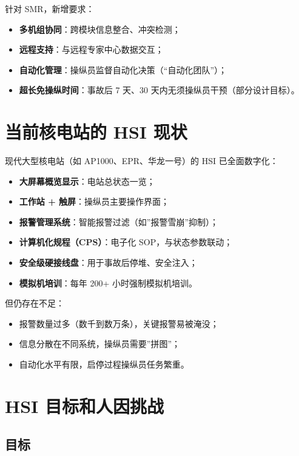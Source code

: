 \documentclass[
  UTF8,
  scheme=plain,
  fontsize=10pt,
  openany
]{ctexbook}
\begin{document}
针对 SMR，新增要求：

\begin{itemize}
\tightlist
\item
  \textbf{多机组协同}：跨模块信息整合、冲突检测；
\item
  \textbf{远程支持}：与远程专家中心数据交互；
\item
  \textbf{自动化管理}：操纵员监督自动化决策（``自动化团队''）；
\item
  \textbf{超长免操纵时间}：事故后 7 天、30
  天内无须操纵员干预（部分设计目标）。
\end{itemize}

\section{当前核电站的 HSI
现状}\label{ux5f53ux524dux6838ux7535ux7ad9ux7684-hsi-ux73b0ux72b6}

现代大型核电站（如 AP1000、EPR、华龙一号）的 HSI 已全面数字化：

\begin{itemize}
\tightlist
\item
  \textbf{大屏幕概览显示}：电站总状态一览；
\item
  \textbf{工作站 + 触屏}：操纵员主要操作界面；
\item
  \textbf{报警管理系统}：智能报警过滤（如''报警雪崩''抑制）；
\item
  \textbf{计算机化规程（CPS）}：电子化 SOP，与状态参数联动；
\item
  \textbf{安全级硬接线盘}：用于事故后停堆、安全注入；
\item
  \textbf{模拟机培训}：每年 200+ 小时强制模拟机培训。
\end{itemize}

但仍存在不足：

\begin{itemize}
\tightlist
\item
  报警数量过多（数千到数万条），关键报警易被淹没；
\item
  信息分散在不同系统，操纵员需要''拼图''；
\item
  自动化水平有限，启停过程操纵员任务繁重。
\end{itemize}

\section{HSI
目标和人因挑战}\label{hsi-ux76eeux6807ux548cux4ebaux56e0ux6311ux6218}

\subsection{目标}\label{ux76eeux6807}
\end{document}
